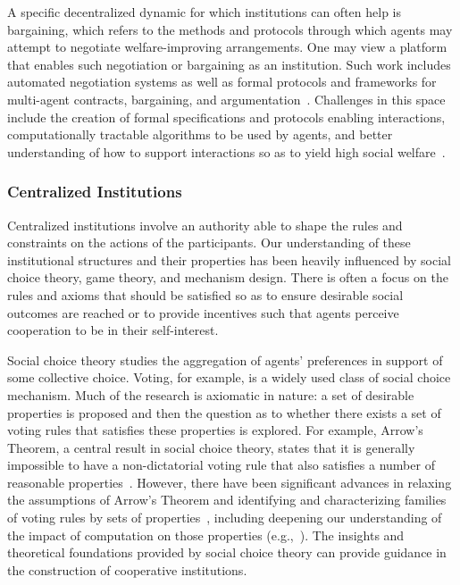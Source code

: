\documentclass[11pt, a4paper, logo, onecolumn, nonumbering]{deepmind}
\begin{document}
A specific decentralized dynamic for which institutions can often help is bargaining, which refers to the methods and protocols through which agents may attempt to negotiate welfare-improving arrangements. One may view a platform that enables such negotiation or bargaining as an institution. Such work includes automated negotiation systems as well as formal protocols and frameworks for multi-agent contracts, bargaining, and argumentation~\cite{smith1980contract,rosenschein1994rules,sandholm1995issues,kraus1997negotiation,jennings2001automated,mcburney2002desiderata,kakas2006adaptive,larson2001bargaining,baarslag2013evaluating}. 
Challenges in this space include the creation of formal specifications and protocols enabling interactions, computationally tractable algorithms to be used by agents, and better understanding of how to support interactions so as to yield high social welfare~\cite{kraus1997negotiation,jennings2001automated,yan2007autonomous,laengle2018twenty}.




\subsubsection{Centralized Institutions}
\label{l_sect_inst_centralized}


Centralized institutions involve an authority able to shape the 
rules and constraints on the actions of the participants.  Our understanding of these institutional structures and their properties has  been heavily influenced by social choice theory, game theory, and mechanism design.
There is  often  a  focus on the rules and axioms that should be satisfied so as to ensure desirable social outcomes are reached or to provide incentives such that agents perceive cooperation to be in their self-interest.



Social choice theory studies the aggregation of agents' preferences in support of some collective choice. Voting, for example, is a widely used class of social choice mechanism. 
Much of the research is axiomatic in nature: a set of desirable properties is proposed and then the question as to whether there exists a set of voting rules that satisfies these properties is explored. For example, Arrow's Theorem, a central result in social choice theory, states that it is generally impossible to have a non-dictatorial voting rule that also satisfies a number of reasonable properties~\cite{arrow1951social}. However, there have been significant advances in relaxing the assumptions of Arrow's Theorem and identifying and characterizing families 
of voting rules by sets of properties~\cite{brandt2016handbook}, including deepening our understanding of the impact of computation on those properties (e.g.,~\cite{bartholdi1989computational,bartholdi1992hard,faliszewski2010ai,faliszewski2010using,conitzer2002complexity,conitzer2002vote,zuckerman2009algorithms,menon2017computational}). The insights and theoretical foundations provided by social choice theory can provide guidance in the construction of cooperative institutions. 
\end{document}
